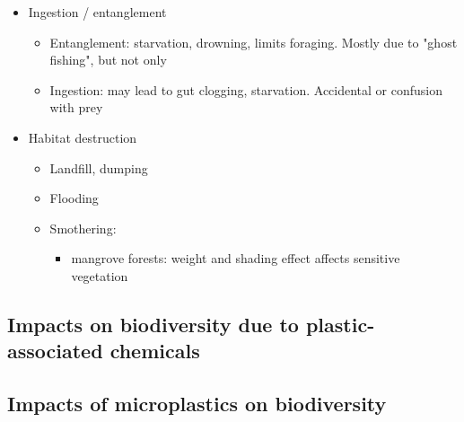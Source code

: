 \begin{itemize}
	\item Ingestion / entanglement
	\begin{itemize}
		\item Entanglement: starvation, drowning, limits foraging.
			Mostly due to "ghost fishing", but not only
		\item Ingestion: may lead to gut clogging, starvation.
			Accidental or confusion with prey
	\end{itemize}
	\item Habitat destruction
	\begin{itemize}
		\item Landfill, dumping
		\item Flooding
		\item Smothering:
		\begin{itemize}
			\item mangrove forests: weight and shading
			effect affects sensitive vegetation
		\end{itemize}
	\end{itemize}
\end{itemize}

\subsection{Impacts on biodiversity due to plastic-associated chemicals}

\subsection{Impacts of microplastics on biodiversity}

